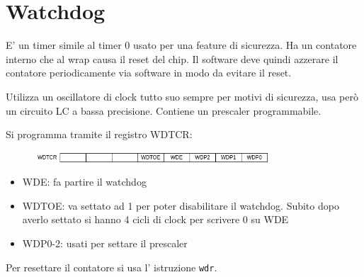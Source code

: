 \section{Watchdog}
E' un timer simile al timer 0 usato per una feature di sicurezza.
Ha un contatore interno che al wrap causa il reset del chip.
Il software deve quindi azzerare il contatore periodicamente via software in modo da evitare il reset.

Utilizza un oscillatore di clock tutto suo sempre per motivi di sicurezza, usa però un circuito LC a bassa precisione.
Contiene un prescaler programmabile.

Si programma tramite il registro WDTCR:
\begin{figure}[H]
    \centering
    \includegraphics[width=330px]{images/28_Watchdog/WDTCR.png}
\end{figure}
\begin{itemize}
    \item WDE: fa partire il watchdog
    \item WDTOE: va settato ad 1 per poter disabilitare il watchdog.
    Subito dopo averlo settato si hanno 4 cicli di clock per scrivere 0 su WDE
    \item WDP0-2: usati per settare il prescaler 
\end{itemize}

Per resettare il contatore si usa l' istruzione \verb{wdr{.
